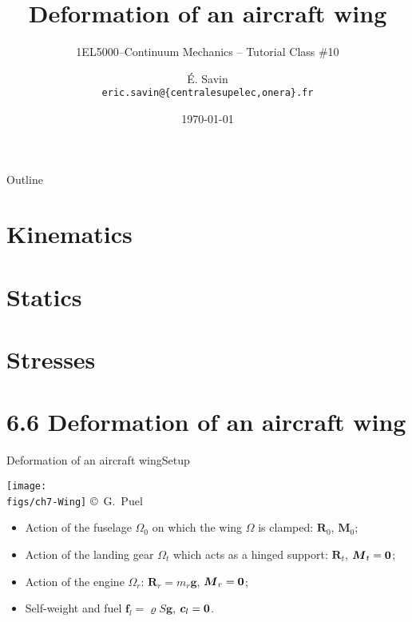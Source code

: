 \documentclass{beamer}
\title[1EL5000/S10]
{Deformation of an aircraft wing}
\subtitle{1EL5000--Continuum Mechanics -- Tutorial Class \#10} %
\author[\'E. Savin] %
{\'E. Savin\inst{1,2}\\ \scriptsize{\texttt{eric.savin@\{centralesupelec,onera\}.fr}}}%
\institute[Onera] %
{\inst{1}{Information Processing and Systems Dept.\\\Onera, France}
\and
 \inst{2}{Mechanical and Civil Engineering Dept.\\\ECP, France}}%
\date{\today}
\newcommand{\cj}{c}
\newcommand{\cv}{{\boldsymbol\cj}}
\newcommand{\medium}{\Omega}
\newcommand{\fj}{f}
\newcommand{\gj}{g}
\newcommand{\fv}{{\boldsymbol\fj}}
\newcommand{\gv}{{\boldsymbol\gj}}
\newcommand{\roi}{\varrho}
\newcommand{\Fresj}{R}
\newcommand{\Mresj}{M}
\newcommand{\Fres}{{\boldsymbol\Fresj}}
\newcommand{\Mres}{{\boldsymbol\Mresj}}
\newcommand{\bzero}{{\bf 0}}
\begin{document}
\begin{frame}
  \titlepage
\end{frame}

\begin{frame}{Outline}
  \tableofcontents
\end{frame}




\section{Kinematics}


\section{Statics}


\section{Stresses}


\section{6.6 Deformation of an aircraft wing}

\begin{frame}{Deformation of an aircraft wing}{Setup}

\centering\texttt{[image: \\figs/ch7-Wing]}
\vskip-10pt{\hspace{5truecm}\mbox{\tiny{\copyright\ G. Puel}}}

\begin{itemize}
\item Action of the fuselage $\medium_0$ on which the wing $\medium$ is clamped: $\Fres_0$, $\Mres_0$; 
\item Action of the landing gear $\medium_t$ which acts as a hinged support: $\Fres_t$, $\Mres_t=\bzero$;
\item Action of the engine $\medium_r$: $\Fres_r=m_r\gv$, $\Mres_r=\bzero$;
\item Self-weight and fuel $\fv_l=\roi S\gv$, $\cv_l=\bzero$.
\end{itemize}

\end{frame}
\end{document}
